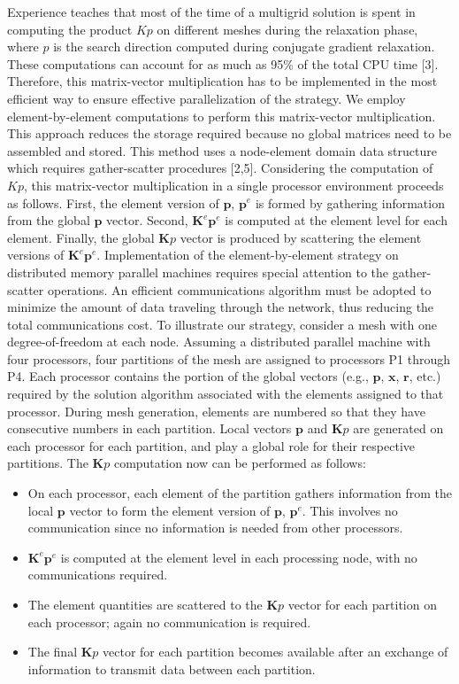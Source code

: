 \documentclass[11pt]{article}
\begin{document}
Experience teaches that most of the time of a multigrid solution is
spent in computing the product $Kp$ on different meshes during
the relaxation phase, where $p$ is the search direction computed
during conjugate gradient relaxation. These computations can account for
as much as 95\% of the total CPU time [3]. Therefore, this matrix-vector
multiplication has to be implemented in the most efficient way to ensure
effective parallelization of the strategy. We employ element-by-element
computations to perform this matrix-vector multiplication. This approach
reduces the storage required because no global matrices need to be assembled
and stored. This method uses a node-element domain data structure which
requires gather-scatter procedures [2,5].
Considering the computation of $Kp$, this matrix-vector
multiplication in a single processor environment proceeds as follows.
First, the element version of
${\mathbf p}$, ${\mathbf p}^e$
is formed by gathering information from the global
${\mathbf p}$ vector.
Second, ${\mathbf K}^e{\mathbf p}^e$ is computed at
the element level for each element.
Finally, the global ${\mathbf Kp}$
vector is produced by scattering the element versions of
${\mathbf K}^e{\mathbf p}^e$.
Implementation of the element-by-element strategy on distributed memory
parallel machines requires special attention to the gather-scatter operations.
An efficient communications algorithm must be adopted to minimize the amount
of data traveling through the network, thus reducing the total communications
cost. To illustrate our strategy, consider a mesh with one degree-of-freedom
at each node. Assuming a distributed parallel machine with four processors,
four partitions of the mesh are assigned to processors P1 through P4. Each
processor contains the portion of the global vectors
(e.g., ${\mathbf p}$, ${\mathbf x}$, ${\mathbf r}$, etc.)
required by the solution algorithm
associated with the elements assigned to that processor.
During mesh generation, elements are numbered so that they
have consecutive numbers in each partition.
Local vectors ${\mathbf p}$ and ${\mathbf Kp}$ are generated on each
processor for each partition, and play a global role for their respective
partitions. The ${\mathbf Kp}$ computation now can be performed as follows:
\begin{itemize}
\item
On each processor, each element of the partition gathers information from
the local $\mathbf{p}$ vector to form the element version of ${\mathbf p}$,
${\mathbf p}^e$.  This involves no communication since no information
is needed from other processors.
\item
${\mathbf K}^e{\mathbf p}^e$ is computed at the element
level in each processing node, with no communications required.
\item
The element quantities are scattered to the ${\mathbf Kp}$ vector for
each partition on each processor; again no communication is required.
\item
The final ${\mathbf Kp}$ vector for each partition becomes available
after an exchange of information to transmit data between each partition.
\end{itemize}
\end{document}
